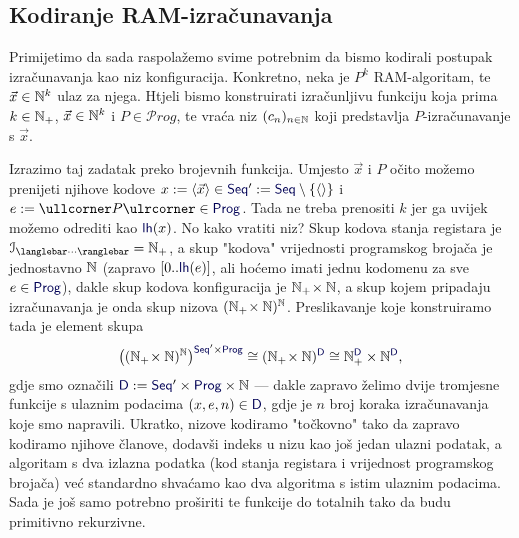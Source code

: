 \subsection{Kodiranje RAM-izračunavanja}

Primijetimo da sada raspolažemo svime potrebnim da bismo kodirali postupak iz\-ra\-ču\-na\-va\-nja kao niz konfiguracija. Konkretno, neka je $P^k$ RAM-algoritam, te $\vec x\in{\mathbb N}^k$ ulaz za njega. Htjeli bismo konstruirati izračunljivu funkciju koja prima $k\in{\mathbb N}_+$, $\vec x\in{\mathbb N}^k$ i $P\in\mathcal Prog$, te vraća niz $(c_n)_{n\in{\mathbb N}}$ koji predstavlja $P$-izračunavanje s $\vec x$. 

Izrazimo taj zadatak preko brojevnih funkcija. Umjesto $\vec x$ i $P$ očito možemo prenijeti njihove kodove $x:=\langle\vec x\rangle\in\f{Seq}':=\f{Seq}\setminus\{\langle\rangle\}$ i $e:=\kprog{P}\in\f{Prog}$. Tada ne treba prenositi $k$ jer ga uvijek možemo odrediti kao $\f{lh}(x)$. No kako vratiti niz? Skup kodova stanja registara je $\im{\knk{\cdots}}=\N_+$, a skup "kodova" vrijednosti programskog brojača je jednostavno ${\mathbb N}$ (zapravo $[0..\f{lh}(e)]$, ali hoćemo imati jednu kodomenu za sve $e\in\f{Prog}$), dakle skup kodova konfiguracija je ${\mathbb N}_+\!\times{\mathbb N}$, a skup kojem pripadaju izračunavanja je onda skup nizova $({\mathbb N}_+\!\times{\mathbb N})^{\mathbb N}$. Preslikavanje koje konstruiramo tada je element skupa
\begin{equation}
    \bigl((\N_+\!\times\N)^\N\bigr)^{\f{Seq}'\times\f{Prog}}\cong
    (\N_+\!\times\N)^{\f D}\cong\N_+^{\f D}\times\N^{\f D}\text,
\end{equation}
gdje smo označili $\f D:=\f{Seq}'\times\f{Prog}\times\N$ --- dakle zapravo želimo dvije tromjesne funkcije s ulaznim podacima $(x,e,n)\in\f D$, gdje je $n$ broj koraka izračunavanja koje smo napravili. Ukratko, nizove kodiramo "točkovno" tako da zapravo kodiramo njihove članove, dodavši indeks u nizu kao još jedan ulazni podatak, a algoritam s dva izlazna podatka (kod stanja registara i vrijednost programskog brojača) već standardno shvaćamo kao dva algoritma s istim ulaznim podacima. Sada je još samo potrebno proširiti te funkcije do totalnih tako da budu primitivno rekurzivne.

